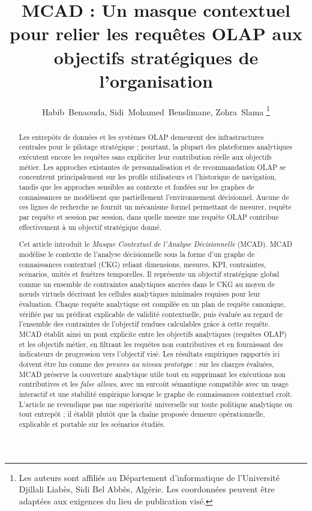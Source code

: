 \documentclass[journal]{IEEEtran}
\begin{document}
\title{MCAD : Un masque contextuel pour relier les requêtes OLAP aux objectifs stratégiques de l'organisation}

\author{Habib~Benaouda, Sidi~Mohamed~Benslimane, Zohra~Slama%
\thanks{Les auteurs sont affiliés au Département d'informatique de l'Université Djillali Liabès, Sidi Bel Abbès, Algérie. Les coordonnées peuvent être adaptées aux exigences du lieu de publication visé.}%
}

\maketitle

\begin{abstract}
Les entrepôts de données et les systèmes OLAP demeurent des infrastructures centrales pour le pilotage stratégique ; pourtant, la plupart des plateformes analytiques exécutent encore les requêtes sans expliciter leur contribution réelle aux objectifs métier. Les approches existantes de personnalisation et de recommandation OLAP se concentrent principalement sur les profils utilisateurs et l'historique de navigation, tandis que les approches sensibles au contexte et fondées sur les graphes de connaissances ne modélisent que partiellement l'environnement décisionnel. Aucune de ces lignes de recherche ne fournit un mécanisme formel permettant de mesurer, requête par requête et session par session, dans quelle mesure une requête OLAP contribue effectivement à un objectif stratégique donné.

Cet article introduit le \emph{Masque Contextuel de l'Analyse Décisionnelle} (MCAD). MCAD modélise le contexte de l'analyse décisionnelle sous la forme d'un graphe de connaissances contextuel (CKG) reliant dimensions, mesures, KPI, contraintes, scénarios, unités et fenêtres temporelles. Il représente un objectif stratégique global comme un ensemble de contraintes analytiques ancrées dans le CKG au moyen de nœuds virtuels décrivant les cellules analytiques minimales requises pour leur évaluation. Chaque requête analytique est compilée en un plan de requête canonique, vérifiée par un prédicat explicable de validité contextuelle, puis évaluée au regard de l'ensemble des contraintes de l'objectif rendues calculables grâce à cette requête. MCAD établit ainsi un pont explicite entre les objectifs analytiques (requêtes OLAP) et les objectifs métier, en filtrant les requêtes non contributives et en fournissant des indicateurs de progression vers l'objectif visé. Les résultats empiriques rapportés ici doivent être lus comme des \emph{preuves au niveau prototype} : sur les charges évaluées, MCAD préserve la couverture analytique utile tout en supprimant les exécutions non contributives et les \emph{false allows}, avec un surcoût sémantique compatible avec un usage interactif et une stabilité empirique lorsque le graphe de connaissances contextuel croît. L'article ne revendique pas une supériorité universelle sur toute politique analytique ou tout entrepôt ; il établit plutôt que la chaîne proposée demeure opérationnelle, explicable et portable sur les scénarios étudiés.
\end{abstract}
\end{document}

